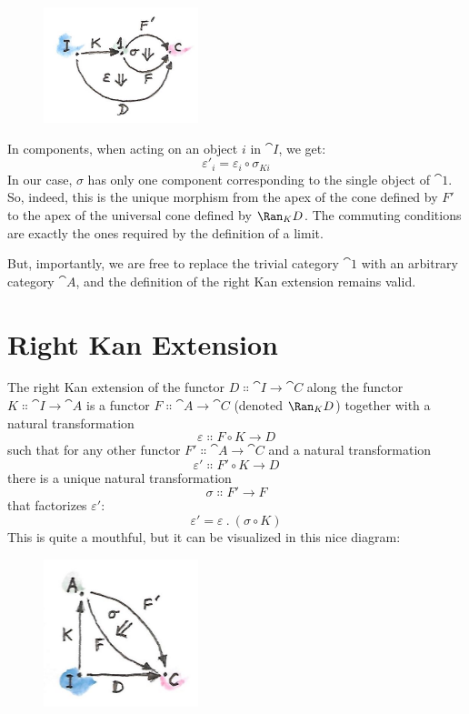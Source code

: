 \begin{figure}[H]
\centering
\includegraphics[width=0.4\textwidth]{images/kan5.jpg}
\end{figure}

\noindent
In components, when acting on an object $i$ in $\cat{I}$, we get:
\[\varepsilon'_i = \varepsilon_i \circ \sigma_{K i}\]
In our case, $\sigma$ has only one component corresponding to the
single object of $\cat{1}$. So, indeed, this is the unique morphism
from the apex of the cone defined by $F'$ to the apex of
the universal cone defined by $\Ran_{K}D$. The commuting conditions
are exactly the ones required by the definition of a limit.

But, importantly, we are free to replace the trivial category $\cat{1}$
with an arbitrary category $\cat{A}$, and the definition of the right Kan
extension remains valid.

\section{Right Kan Extension}

The right Kan extension of the functor $D \Colon \cat{I} \to \cat{C}$
along the functor $K \Colon \cat{I} \to \cat{A}$ is a functor
$F \Colon \cat{A} \to \cat{C}$ (denoted $\Ran_{K}D$) together with a
natural transformation
\[\varepsilon \Colon F \circ K \to D\]
such that for any other functor $F' \Colon \cat{A} \to \cat{C}$ and
a natural transformation
\[\varepsilon' \Colon F' \circ K \to D\]
there is a unique natural transformation
\[\sigma \Colon F' \to F\]
that factorizes $\varepsilon'$:
\[\varepsilon' = \varepsilon\ .\ (\sigma \circ K)\]
This is quite a mouthful, but it can be visualized in this nice diagram:

\begin{figure}[H]
\centering
\includegraphics[width=0.4\textwidth]{images/kan7.jpg}
\end{figure}


